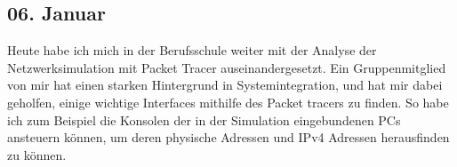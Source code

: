 \subsection{06. Januar}
Heute habe ich mich in der Berufsschule weiter mit der Analyse der Netzwerksimulation mit Packet Tracer auseinandergesetzt. Ein Gruppenmitglied von mir hat einen starken Hintergrund in Systemintegration, und hat mir dabei geholfen, einige wichtige Interfaces mithilfe des Packet tracers zu finden. So habe ich zum Beispiel die Konsolen der in der Simulation eingebundenen PCs ansteuern können, um deren physische Adressen und IPv4 Adressen herausfinden zu können.
